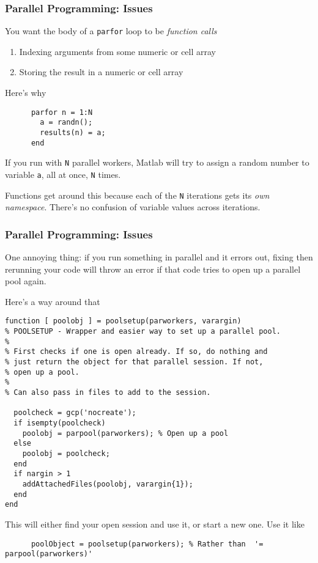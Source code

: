 \documentclass{beamer}
\begin{document}
  \begin{frame}[fragile]
    \frametitle{Parallel Programming: Issues}

    You want the body of a \texttt{parfor} loop to be \emph{function
    calls}
    \begin{enumerate}
      \item Indexing arguments from some numeric or cell array
      \item Storing the result in a numeric or cell array
    \end{enumerate}\pause
    Here's why
    \begin{lstlisting}
      parfor n = 1:N
        a = randn();
        results(n) = a;
      end
    \end{lstlisting}
    If you run with \texttt{N} parallel workers, Matlab will try to
    assign a random number to variable \texttt{a}, all at once,
    \texttt{N} times.

    \vspace{10pt}
    Functions get around this because each of the \texttt{N} iterations
    gets its \emph{own namespace}. There's no confusion of variable
    values across iterations.

	\end{frame}


  \begin{frame}[fragile, shrink=20]
    \frametitle{Parallel Programming: Issues}

    One annoying thing: if you run something in parallel and it errors
    out, fixing then rerunning your code will throw an error if that
    code tries to open up a parallel pool again.\pause

    \vspace{10pt}
    Here's a way around that
    \begin{lstlisting}
function [ poolobj ] = poolsetup(parworkers, varargin)
% POOLSETUP - Wrapper and easier way to set up a parallel pool.
%
% First checks if one is open already. If so, do nothing and
% just return the object for that parallel session. If not,
% open up a pool.
%
% Can also pass in files to add to the session.

  poolcheck = gcp('nocreate');
  if isempty(poolcheck)
    poolobj = parpool(parworkers); % Open up a pool
  else
    poolobj = poolcheck;
  end
  if nargin > 1
    addAttachedFiles(poolobj, varargin{1});
  end
end
    \end{lstlisting}
    This will either find your open session and use it, or start a new
    one. Use it like
    \begin{lstlisting}
      poolObject = poolsetup(parworkers); % Rather than  '= parpool(parworkers)'
    \end{lstlisting}

	\end{frame}
\end{document}
